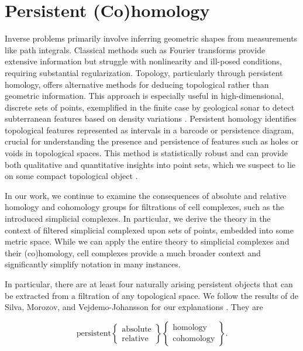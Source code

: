 \section{Persistent (Co)homology}
Inverse problems primarily involve inferring geometric shapes from measurements like
path integrals. Classical methods such as Fourier transforms provide extensive
information but struggle with nonlinearity and ill-posed conditions, requiring substantial
regularization. Topology, particularly through persistent homology, offers
alternative methods for deducing topological rather than geometric information. This
approach is especially useful in high-dimensional, discrete sets of points, exemplified
in the finite case by geological sonar to detect subterranean features based on density
variations \cite[\S 1]{de2011dualities}. Persistent homology identifies
topological features represented as intervals in a barcode or persistence
diagram, crucial for understanding the presence and persistence of features such
as holes or voids in topological spaces. This method is statistically robust and
can provide both qualitative and quantitative insights into point sets, which we
suspect to lie on some compact topological object \cite{chazal2014persistence,chazal2009proximity}.

In our work, we continue to examine the consequences of absolute and relative
homology and cohomology groups for filtrations of cell complexes, such as the introduced
simplicial complexes. In particular, we derive the theory in the context of filtered
simplicial complexed upon sets of points, embedded into some metric space. While
we can apply the entire theory to simplicial complexes and their (co)homology, cell
complexes provide a much broader context and significantly simplify notation in many
instances.

In particular, there are at least four naturally arising persistent objects that
can be extracted from a filtration of any topological space. We follow the results
of de Silva, Morozov, and Vejdemo-Johansson for our explanations \cite[\S 1]{de2011dualities}.
They are

\begin{equation*}
	\text{persistent}
	\begin{Bmatrix}
		\text{absolute} \\
		\text{relative}
	\end{Bmatrix}
	\begin{Bmatrix}
		\text{homology}   \\
		\text{cohomology}
	\end{Bmatrix}.
\end{equation*}


